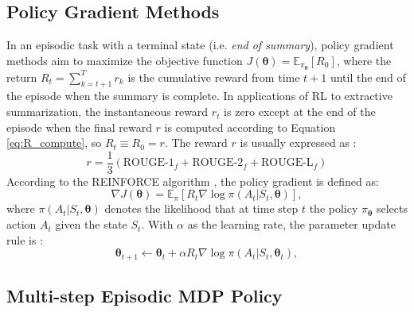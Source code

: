\documentclass[11pt]{article}
\begin{document}
\subsection{Policy Gradient Methods}




In an episodic task with a terminal state (i.e. \textit{end of summary}), policy gradient methods aim to maximize the objective function  $J(\bm{\theta})=\mathbb{E}_{\pi_{\bm{\theta}}}[R_0]$, where the return $R_t=\sum_{k=t+1}^{T}r_k$ is the cumulative reward from time $t+1$ until the end of the episode when the summary is complete. In applications of RL to extractive summarization, the instantaneous reward $r_t$ is zero except at the end of the episode when the final reward $r$ is computed according to Equation \eqref{eq:R_compute}, so $R_t\equiv R_0=r$. The reward $r$ is usually expressed as
\cite{dong2018banditsum}:
\begin{equation}
\label{eq:R_compute}
r = \frac{1}{3}( \text{ROUGE-1}_f +\text{ROUGE-2}_f+\text{ROUGE-L}_f  )
\end{equation}
According to the REINFORCE algorithm \cite{williams1992simple}, the policy gradient is defined as:
\begin{equation}
    \nabla J(\bm{\theta}) = \mathbb{E}_\pi[R_t\nabla\log\pi(A_t\vert S_t,\bm{\theta})],
\end{equation}
where $\pi(A_t\vert S_t, \bm{\theta})$ denotes the likelihood that at time step $t$ the policy  $\pi_{\bm{\theta}}$ selects action $A_t$ given the state $S_t$.
With $\alpha$ as the learning rate, the parameter update rule is \cite{sutton2018}:
\begin{equation}
    \label{eq:update_rule}
    \bm{\theta}_{t+1} \leftarrow \bm{\theta}_t + \alpha R_t \nabla\log\pi(A_t\vert S_t,\bm{\theta}_t),\end{equation}


\subsection{Multi-step Episodic MDP Policy}
\end{document}
